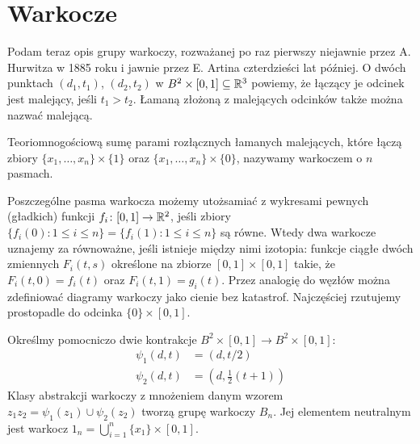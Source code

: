\section{Warkocze} %
\label{sec:braid}
Podam teraz opis grupy warkoczy, rozważanej po raz pierwszy niejawnie przez A. Hurwitza w 1885 roku i jawnie przez E. Artina czterdzieści lat później.
O dwóch punktach $(d_1, t_1)$, $(d_2, t_2)$ w $B^2 \times [0, 1] \subseteq \mathbb R^3$ powiemy, że łączący je odcinek jest malejący, jeśli $t_1 > t_2$.
Łamaną złożoną z malejących odcinków także można nazwać malejącą.

\begin{definition}[warkocz] \label{braid_def}
    Teoriomnogościową sumę parami rozłącznych łamanych malejących, które łączą zbiory $\{x_1, \ldots, x_n\} \times \{1\}$ oraz $\{x_1, \ldots, x_n\} \times \{0\}$, nazywamy warkoczem o $n$ pasmach.
\end{definition}

Poszczególne pasma warkocza możemy utożsamiać z wykresami pewnych (gładkich) funkcji $f_i \colon [0, 1] \to \mathbb R^2$, jeśli zbiory $\{f_i(0) : 1 \le i \le n\} = \{f_i(1) : 1 \le i \le n\}$ są równe.
Wtedy dwa warkocze uznajemy za równoważne, jeśli istnieje między nimi izotopia: funkcje ciągłe dwóch zmiennych $F_i(t, s)$ określone na zbiorze $[0,1] \times [0,1]$ takie, że $F_i(t,0)= f_i(t)$ oraz $F_i(t, 1) = g_i(t)$.
Przez analogię do węzłów można zdefiniować diagramy warkoczy jako cienie bez katastrof.
Najczęściej rzutujemy prostopadle do odcinka $\{0\} \times [0, 1]$.

\begin{definition} 
    Określmy pomocniczo dwie kontrakcje $B^2 \times [0,1] \to B^2 \times [0,1]$:
    \begin{align*}
        \psi_1(d, t)&  = (d, t/2) \\
        \psi_2(d, t)&  = (d, \frac12 (t+1))
    \end{align*}
    Klasy abstrakcji warkoczy z mnożeniem danym wzorem $z_1z_2 = \psi_1(z_1) \cup \psi_2(z_2)$ tworzą grupę warkoczy $B_n$.
    Jej elementem neutralnym jest warkocz $1_n = \bigcup_{i = 1}^n \{x_1\} \times [0,1]$.
\end{definition}


